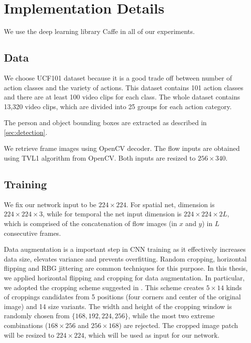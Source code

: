 \chapter{Implementation Details}\label{chap:setup}
We use the deep learning library Caffe \cite{jia2014caffe} in all of our experiments.

\section{Data}
We choose UCF101 dataset because it is a good trade off between number of action classes and the variety of actions. 
This dataset contains 101 action classes and there are at least 100 video clips for each class. 
The whole dataset contains 13,320 video clips, which are divided into 25 groups for each action category.

The person and object bounding boxes are extracted as described in \autoref{sec:detection}.

We retrieve frame images using OpenCV decoder. The flow inputs are obtained using TVL1 algorithm from OpenCV. Both inputs are resized to $ 256 \times 340 $. 

\section{Training}
We fix our network input to be $ 224 \times 224$.
For spatial net, dimension is $ 224 \times 224 \times 3 $, 
while for temporal the net input dimension is $ 224 \times 224 \times 2L $, which is comprised of the concatenation of flow images (in $ x $ and $ y $) in $ L $ consecutive frames.

Data augmentation is a important step in CNN training as it effectively increases data size, elevates variance and prevents overfitting.
Random cropping, horizontal flipping and RBG jittering are common techniques for this purpose.
In this thesis, we applied horizontal flipping and cropping for data augmentation. 
In particular, we adopted the cropping scheme suggested in \cite{wang2015towards}.
This scheme creates $ 5\times 14 $ kinds of croppings candidates from 5 positions (four corners and center of the original image) and 14 size variants.
The width and height of the cropping window is randomly chosen from $ \lbrace 168, 192, 224, 256 \rbrace $, while the most two extreme combinations ($ 168 \times 256 $ and $ 256 \times 168 $) are rejected.
The cropped image patch will be resized to $ 224\times 224 $, which will be used as input for our network.

